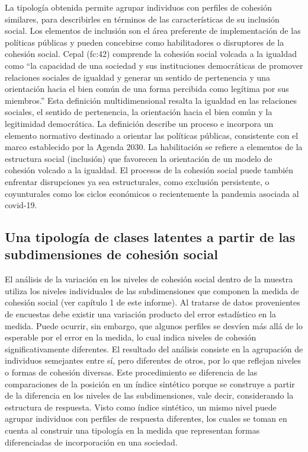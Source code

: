 \documentclass[
  12pt,
]{book}
\begin{document}
La tipología obtenida permite agrupar individuos con perfiles de cohesión similares, para describirles en términos de las características de su inclusión social. Los elementos de inclusión son el área preferente de implementación de las políticas públicas y pueden concebirse como habilitadores o disruptores de la cohesión social. Cepal (fc:42) comprende la cohesión social volcada a la igualdad como ``la capacidad de una sociedad y sus instituciones democráticas de promover relaciones sociales de igualdad y generar un sentido de pertenencia y una orientación hacia el bien común de una forma percibida como legítima por sus miembros.'' Esta definición multidimensional resalta la igualdad en las relaciones sociales, el sentido de pertenencia, la orientación hacia el bien común y la legitimidad democrática. La definición describe un proceso e incorpora un elemento normativo destinado a orientar las políticas públicas, consistente con el marco establecido por la Agenda 2030. La habilitación se refiere a elementos de la estructura social (inclusión) que favorecen la orientación de un modelo de cohesión volcado a la igualdad. El procesos de la cohesión social puede también enfrentar disrupciones ya sea estructurales, como exclusión persistente, o coyunturales como los ciclos económicos o recientemente la pandemia asociada al covid-19.

\hypertarget{una-tipologuxeda-de-clases-latentes-a-partir-de-las-subdimensiones-de-cohesiuxf3n-social}{%
\subsection{Una tipología de clases latentes a partir de las subdimensiones de cohesión social}\label{una-tipologuxeda-de-clases-latentes-a-partir-de-las-subdimensiones-de-cohesiuxf3n-social}}

El análisis de la variación en los niveles de cohesión social dentro de la muestra utiliza los niveles individuales de las subdimensiones que componen la medida de cohesión social (ver capítulo 1 de este informe). Al tratarse de datos provenientes de encuestas debe existir una variación producto del error estadístico en la medida. Puede ocurrir, sin embargo, que algunos perfiles se desvíen más allá de lo esperable por el error en la medida, lo cual indica niveles de cohesión significativamente diferentes. El resultado del análisis consiste en la agrupación de individuos semejantes entre sí, pero diferentes de otros, por lo que reflejan niveles o formas de cohesión diversas. Este procedimiento se diferencia de las comparaciones de la posición en un índice sintético porque se construye a partir de la diferencia en los niveles de las subdimensiones, vale decir, considerando la estructura de respuesta. Visto como índice sintético, un mismo nivel puede agrupar individuos con perfiles de respuesta diferentes, los cuales se toman en cuenta al construir una tipología en la medida que representan formas diferenciadas de incorporación en una sociedad.
\end{document}
